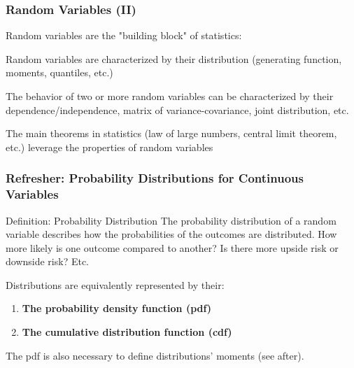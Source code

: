 \documentclass{beamer}
\newenvironment{wideitemize}{\itemize\addtolength{\itemsep}{10pt}}{\enditemize}
\begin{document}
\begin{frame}
  \frametitle{Random Variables (II)}    
  \begin{wideitemize}
  \item Random variables are the "building block" of statistics:
    \begin{wideitemize}
    \item Random variables are characterized by their distribution (generating
      function, moments, quantiles, etc.)
    \item The behavior of two or more random variables can be characterized by
      their dependence/independence, matrix of variance-covariance, joint
      distribution, etc.
    \item The main theorems in statistics (law of large numbers, central limit
      theorem, etc.) leverage the properties of random variables
    \end{wideitemize}
  \end{wideitemize}
\end{frame}


\begin{frame}
  \frametitle{Refresher: Probability Distributions for Continuous Variables}
  
  \begin{block}{Definition: Probability Distribution}
    The probability distribution of a random variable describes how the probabilities of the outcomes are distributed. How more likely is one outcome compared to another? Is there more upside risk or downside risk? Etc.
  \end{block}

\medskip
  
  Distributions are equivalently represented by their:
  \begin{enumerate}
  \item \textbf{The probability density function (pdf)}
  \item \textbf{The cumulative distribution function (cdf)}  
  \end{enumerate}    
  
  The pdf is also necessary to define distributions' moments (see after).\\  
\end{frame}
  
\end{document}
